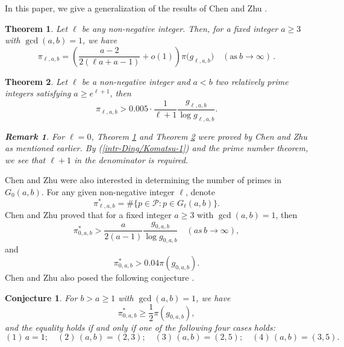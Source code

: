 \documentclass[12pt,a4paper,reqno]{amsart}
\numberwithin{equation}{section}
\theoremstyle{plain}
\newtheorem{theorem}{Theorem}
\newtheorem{conjecture}{Conjecture}
\theoremstyle{definition}
\newtheorem{remark}{Remark}
\begin{document}
In this paper, we give a generalization of the results of Chen and Zhu  \cite{Chen/Zhu}.

\begin{theorem}\label{th1}
	Let $\ell$ be any non-negative integer. Then, for a fixed integer $a\ge 3$ with $\gcd(a,b)=1$, we have
	$$
	\pi_{\ell,a,b}=\left(\frac{a-2}{2(\ell a+a-1)}+o(1)\right)\pi\bigl(g_{\ell,a,b}\bigr)\quad(\text{as}~ b\to\infty)\,. 
	$$ 
\end{theorem}

\begin{theorem}\label{thm-1}
	Let $\ell$ be a non-negative integer and $a<b$ two relatively prime integers satisfying $a\geq e^{\ell+1}$, then
	\begin{equation*}
		\pi_{\ell,a,b}> 0.005 \cdot \frac{1}{\ell+1}\frac{g_{\ell,a,b}}{\log g_{\ell,a,b}}.
	\end{equation*}
	\begin{remark}
		For $\ell=0$, Theorem \ref{th1} and Theorem \ref{thm-1} were proved by Chen and Zhu \cite{Chen/Zhu} as mentioned earlier. By (\ref{intr-Ding/Komatsu-1}) and the prime number theorem, we see that $\ell+1$ in the denominator is required.
	\end{remark}
\end{theorem}

Chen and Zhu were also interested in determining the number of primes in $G_{0}(a,b)$.
For any given non-negative integer $\ell$, denote 
$$
\pi^{*}_{\ell,a,b}=\#\{p\in\mathcal{P}: p\in G_{\ell}(a,b)\}.  
$$
Chen and Zhu \cite{Chen/Zhu-2} proved that for a fixed integer $a\ge 3$ with $\gcd(a,b)=1$, then
\begin{equation*}
	\pi_{0,a,b}^{*} >\frac{a}{2(a-1)}\frac{g_{0,a,b}}{\log g_{0,a,b}} \quad (as\, b\to\infty),
\end{equation*}
and
\begin{equation*}
	\pi_{0,a,b}^{*}> 0.04\pi(g_{0,a,b}).
\end{equation*}
Chen and Zhu also posed the following conjecture \cite[Conjecture 1.4]{Chen/Zhu-2}. 
\begin{conjecture}
	For $b>a\geq 1$ with $\gcd(a,b)=1$, we have
	$$
	\pi_{0,a,b}^{*}\geq \frac{1}{2}\pi(g_{0,a,b}), 
	$$
	and the equality holds if and only if one of the following four cases holds:
	\begin{equation*}
		(1)\, a=1; \quad (2)\, (a,b)=(2,3); \quad (3)\, (a,b)=(2,5); \quad (4)\,(a,b)=(3,5). 
	\end{equation*}
\end{conjecture}
\end{document}
